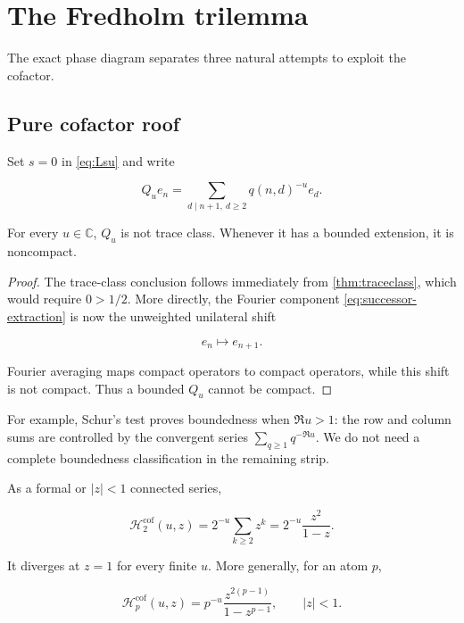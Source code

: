 \section{The Fredholm trilemma}
\label{sec:trilemma}

The exact phase diagram separates three natural attempts to exploit the
cofactor.

\subsection{Pure cofactor roof}

Set \(s=0\) in \cref{eq:Lsu} and write

\[
 Q_ue_n=\sum_{d\mid n+1,\ d\ge2}q(n,d)^{-u}e_d.
\]

\begin{theorem}
\label{thm:pure-obstruction}
For every \(u\in\mathbb C\), \(Q_u\) is not trace class.  Whenever it has a
bounded extension, it is noncompact.
\end{theorem}

\begin{proof}
The trace-class conclusion follows immediately from \cref{thm:traceclass},
which would require \(0>1/2\).  More directly, the Fourier component
\cref{eq:successor-extraction} is now the unweighted unilateral shift

\[
 e_n\longmapsto e_{n+1}.
\]

Fourier averaging maps compact operators to compact operators, while this
shift is not compact.  Thus a bounded \(Q_u\) cannot be compact.
\end{proof}

For example, Schur's test proves boundedness when \(\Re u>1\): the row and
column sums are controlled by the convergent series
\(\sum_{q\ge1}q^{-\Re u}\).  We do not need a complete boundedness
classification in the remaining strip.

\begin{theorem}
\label{thm:pure-series}
As a formal or \(|z|<1\) connected series,

\begin{equation}
 \mathcal H_2^{\mathrm{cof}}(u,z)
 =2^{-u}\sum_{k\ge2}z^k
 =2^{-u}\frac{z^2}{1-z}.
\label{eq:pure-H2}
\end{equation}

It diverges at \(z=1\) for every finite \(u\).  More generally, for an atom
\(p\),

\[
 \mathcal H_p^{\mathrm{cof}}(u,z)
 =p^{-u}\frac{z^{2(p-1)}}{1-z^{p-1}},
 \qquad |z|<1.
\]
\end{theorem}

